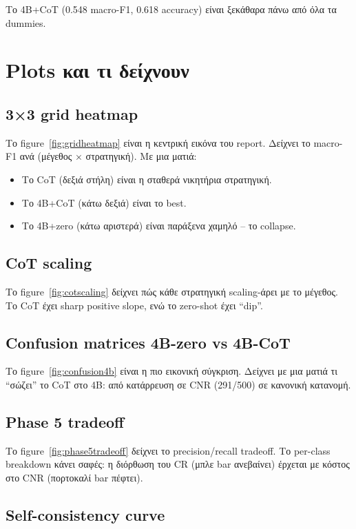 \documentclass[12pt]{fphw}
\begin{document}
Το 4B+CoT (0.548 macro-F1, 0.618 accuracy) είναι ξεκάθαρα πάνω από όλα τα dummies.

\section{Plots και τι δείχνουν}

\subsection{3×3 grid heatmap}

Το figure~\ref{fig:gridheatmap} είναι η κεντρική εικόνα του report. Δείχνει το macro-F1 ανά (μέγεθος × στρατηγική). Με μια ματιά:

\begin{itemize}
    \item Το CoT (δεξιά στήλη) είναι η σταθερά νικητήρια στρατηγική.
    \item Το 4B+CoT (κάτω δεξιά) είναι το best.
    \item Το 4B+zero (κάτω αριστερά) είναι παράξενα χαμηλό -- το collapse.
\end{itemize}

\subsection{CoT scaling}

Το figure~\ref{fig:cotscaling} δείχνει πώς κάθε στρατηγική scaling-άρει με το μέγεθος. Το CoT έχει sharp positive slope, ενώ το zero-shot έχει ``dip''.

\subsection{Confusion matrices 4B-zero vs 4B-CoT}

Το figure~\ref{fig:confusion4b} είναι η πιο εικονική σύγκριση. Δείχνει με μια ματιά τι ``σώζει'' το CoT στο 4B: από κατάρρευση σε CNR (291/500) σε κανονική κατανομή.

\subsection{Phase 5 tradeoff}

Το figure~\ref{fig:phase5tradeoff} δείχνει το precision/recall tradeoff. Το per-class breakdown κάνει σαφές: η διόρθωση του CR (μπλε bar ανεβαίνει) έρχεται με κόστος στο CNR (πορτοκαλί bar πέφτει).

\subsection{Self-consistency curve}
\end{document}
